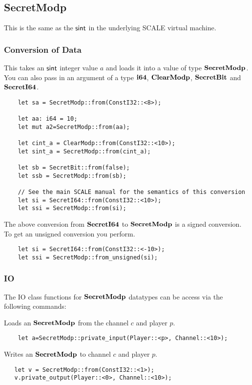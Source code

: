 \subsection{SecretModp}
This is the same as the $\mathsf{sint}$ in the underlying SCALE virtual machine.

\subsubsection{Conversion of Data}
This takes an $\mathsf{sint}$ integer value $a$ and loads it into a value
of type $\mathbf{SecretModp}$.
You can also pass in an argument of a type $\mathbf{i64}$, $\mathbf{ClearModp}$,
$\mathbf{SecretBit}$ and $\mathbf{SecretI64}$.
\begin{lstlisting}
    let sa = SecretModp::from(ConstI32::<8>);

    let aa: i64 = 10;
    let mut a2=SecretModp::from(aa);

    let cint_a = ClearModp::from(ConstI32::<10>);
    let sint_a = SecretModp::from(cint_a);

    let sb = SecretBit::from(false);
    let ssb = SecretModp::from(sb);

    // See the main SCALE manual for the semantics of this conversion
    let si = SecretI64::from(ConstI32::<10>);
    let ssi = SecretModp::from(si);
\end{lstlisting}

The above conversion from $\mathbf{SecretI64}$ to $\mathbf{SecretModp}$ is a signed conversion.
To get an unsigned conversion you perform.
\begin{lstlisting}
    let si = SecretI64::from(ConstI32::<-10>);
    let ssi = SecretModp::from_unsigned(si);
\end{lstlisting}

\subsubsection{IO}
The IO class functions for $\mathbf{SecretModp}$ datatypes can be access via the following commands:

Loads an $\mathbf{SecretModp}$ from the channel $c$ and player $p$.
\begin{lstlisting}
    let a=SecretModp::private_input(Player::<p>, Channel::<10>);
\end{lstlisting}

Writes an $\mathbf{SecretModp}$ to channel $c$ and player $p$.
\begin{lstlisting}
   let v = SecretModp::from(ConstI32::<1>);
   v.private_output(Player::<0>, Channel::<10>);
\end{lstlisting}

